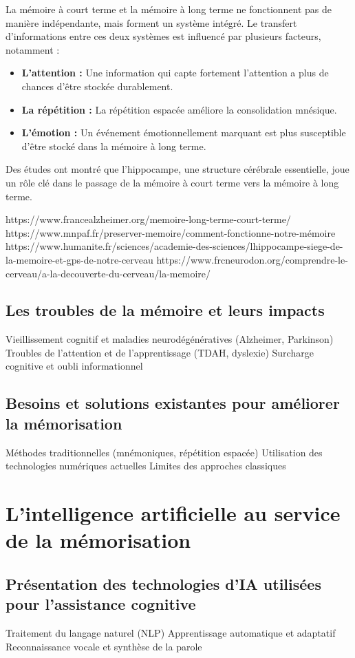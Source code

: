 \documentclass[12pt,a4paper]{report}
\begin{document}
La mémoire à court terme et la mémoire à long terme ne fonctionnent pas de manière indépendante, mais forment un système intégré. Le transfert d'informations entre ces deux systèmes est influencé par plusieurs facteurs, notamment :

\begin{itemize}
    \item \textbf{L'attention :} Une information qui capte fortement l'attention a plus de chances d'être stockée durablement.
    \item \textbf{La répétition :} La répétition espacée améliore la consolidation mnésique.
    \item \textbf{L'émotion :} Un événement émotionnellement marquant est plus susceptible d'être stocké dans la mémoire à long terme.
\end{itemize}

Des études ont montré que l'hippocampe, une structure cérébrale essentielle, joue un rôle clé dans le passage de la mémoire à court terme vers la mémoire à long terme.

https://www.francealzheimer.org/memoire-long-terme-court-terme/
https://www.mnpaf.fr/preserver-memoire/comment-fonctionne-notre-mémoire
https://www.humanite.fr/sciences/academie-des-sciences/lhippocampe-siege-de-la-memoire-et-gps-de-notre-cerveau
https://www.frcneurodon.org/comprendre-le-cerveau/a-la-decouverte-du-cerveau/la-memoire/





\section{Les troubles de la mémoire et leurs impacts}
Vieillissement cognitif et maladies neurodégénératives (Alzheimer, Parkinson)
Troubles de l'attention et de l'apprentissage (TDAH, dyslexie)
Surcharge cognitive et oubli informationnel
\section{Besoins et solutions existantes pour améliorer la mémorisation}
Méthodes traditionnelles (mnémoniques, répétition espacée)
Utilisation des technologies numériques actuelles
Limites des approches classiques
\chapter{L'intelligence artificielle au service de la mémorisation}
\section{Présentation des technologies d'IA utilisées pour l'assistance cognitive}
Traitement du langage naturel (NLP)
Apprentissage automatique et adaptatif
Reconnaissance vocale et synthèse de la parole
\end{document}
